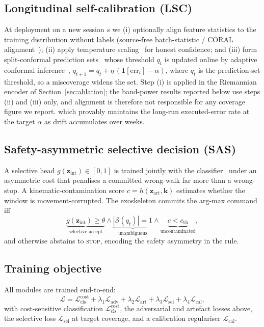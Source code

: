 \documentclass[journal]{IEEEtran}
\begin{document}
\subsection{Longitudinal self-calibration (LSC)}
At deployment on a new session $s$ we (i) optionally align feature statistics to the
training distribution without labels (source-free batch-statistic / CORAL
alignment~\cite{sun2016}); (ii) apply temperature scaling~\cite{guo2017} for honest
confidence; and (iii) form split-conformal prediction sets~\cite{angelopoulos2023}
whose threshold $q_t$ is updated online by adaptive conformal
inference~\cite{gibbs2021},
$q_{t+1}=q_t+\eta\,(\mathbf{1}[\text{err}_t]-\alpha)$,
where $q_t$ is the prediction-set threshold, so a miscoverage widens the set. Step
(i) is applied in the Riemannian encoder of Section~\ref{sec:ablation}; the
band-power results reported below use steps (ii) and (iii) only, and alignment is
therefore not responsible for any coverage figure we report.
which provably maintains the long-run executed-error rate at the target $\alpha$ as
drift accumulates over weeks.

\subsection{Safety-asymmetric selective decision (SAS)}
A selective head $g(\mathbf{z}_{\mathrm{int}})\in[0,1]$ is trained jointly with the
classifier~\cite{geifman2019} under an asymmetric cost that penalises a committed
wrong-walk far more than a wrong-stop. A kinematic-contamination score
$c=h(\mathbf{z}_{\mathrm{art}},\mathbf{k})$ estimates whether the window is
movement-corrupted. The exoskeleton commits the arg-max command iff
\[
\underbrace{g(\mathbf{z}_{\mathrm{int}})\!\ge\!\theta}_{\text{selective accept}}\!\wedge\!
\underbrace{|\mathcal{S}(q_t)|\!=\!1}_{\text{unambiguous}}\!\wedge\!
\underbrace{c<c_{\mathrm{th}}}_{\text{uncontaminated}},
\]
and otherwise abstains to \textsc{stop}, encoding the safety asymmetry in the rule.

\subsection{Training objective}
All modules are trained end-to-end:
\begin{equation}
\mathcal{L}=\mathcal{L}_{\mathrm{cls}}^{\mathrm{cost}}
+\lambda_1\mathcal{L}_{\mathrm{adv}}
+\lambda_2\mathcal{L}_{\mathrm{art}}
+\lambda_3\mathcal{L}_{\mathrm{sel}}
+\lambda_4\mathcal{L}_{\mathrm{cal}},
\end{equation}
with cost-sensitive classification $\mathcal{L}_{\mathrm{cls}}^{\mathrm{cost}}$, the
adversarial and artefact losses above, the selective loss
$\mathcal{L}_{\mathrm{sel}}$ at target coverage, and a calibration regulariser
$\mathcal{L}_{\mathrm{cal}}$.
\end{document}
